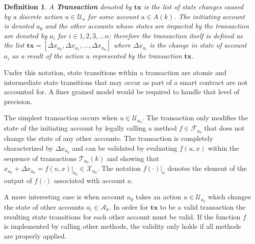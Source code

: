 \documentclass[letterpaper, 10 pt, conference]{ieeeconf}  %
\newtheorem{definition}{Definition}
\begin{document}
\begin{definition} A \textbf{Transaction} denoted by $\mathbf{tx}$ is the list of state changes caused by a discrete action $u\in \mathcal{U}_a$ for some account $a\in A(k)$. The initiating account is denoted $a_0$ and the other accounts whose states are impacted by the transaction are denoted by $a_i$ for $i\in{1,2,3,...n}$; therefore the transaction itself is defined as the list $\mathbf{tx} = [\Delta x_{a_0},\Delta x_{a_1},\ldots ,\Delta x_{a_n} ]$ where $\Delta x_{a_i}$ is the change in state of account $a_i$ as a result of the action $u$ represented by the transaction $\mathbf{tx}$. 
\end{definition}

Under this notation, state transitions within a transaction are atomic and intermediate state transitions that may occur as part of a smart contract are not accounted for. A finer grained model would be required to handle that level of precision.

The simplest transaction occurs when $u\in \mathcal{U}_{a_0}$. The transaction only modifies the state of the initiating account by legally calling a method $f\in\mathcal{F}_{a_0}$ that does not change the state of any other accounts. The transaction is completely characterized by $\Delta x_{a_0}$ and can be validated by evaluating $f(u, x)$ within the sequence of transactions $\mathcal{T}_{a_0}(k)$ and showing that $x_{a_0}+\Delta x_{a_0} = f(u, x)|_{a_0} \in \mathcal{X}_{a_0}$. The notation $f(\cdot)|_{a}$ denotes the element of the output of $f(\cdot)$ associated with account $a$.

A more interesting case is when account $a_0$ takes an action $u\in \mathcal{U}_{a_o}$ which changes the state of other accounts $a_i\in \mathcal{A}_k$. In order for $\mathbf{tx}$ to be a valid transaction the resulting state transitions for each other account must be valid. If the function $f$ is implemented by calling other methods, the validity only holds if all methods are properly applied.
\end{document}
